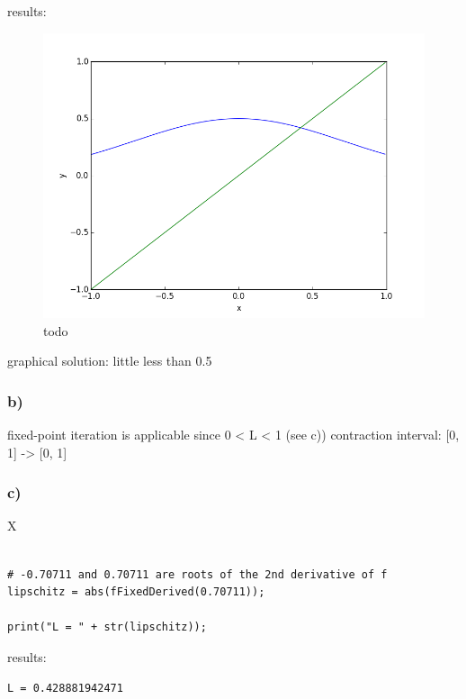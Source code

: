results:



\begin{figure}[!ht]
\includegraphics[width=1\textwidth]{chapters/images/figure-4-8-a}
\caption{todo}
\end{figure}

graphical solution: little less than 0.5



\subsubsection{b)}

fixed-point iteration is applicable since 0 < L < 1 (see c))
contraction interval: [0, 1] -> [0, 1]




\subsubsection{c)}

X

\begin{lstlisting}[caption=todo]

# -0.70711 and 0.70711 are roots of the 2nd derivative of f
lipschitz = abs(fFixedDerived(0.70711));

print("L = " + str(lipschitz));

\end{lstlisting}


results:

\begin{lstlisting}[caption=Result of 1.1 a), keywordstyle=\color{black}]
L = 0.428881942471
\end{lstlisting}

